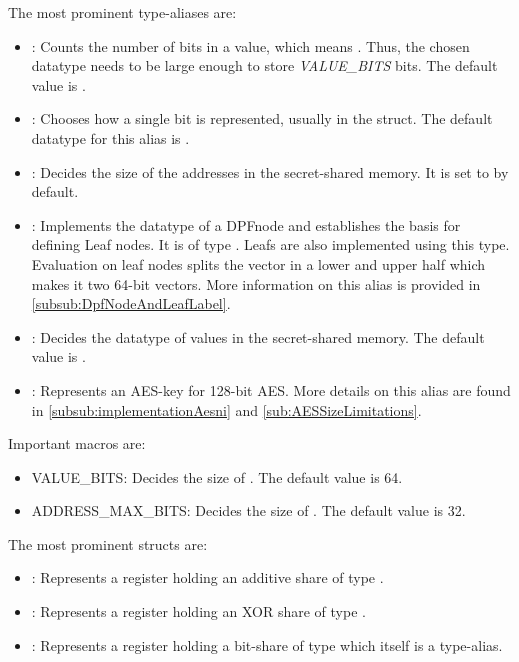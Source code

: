 The most prominent type-aliases are:
\begin{itemize}\label{itemize:importantAliases}
    \item {}: 
    Counts the number of bits in a value, which means .
    Thus, the chosen datatype needs to be large enough to store \textit{VALUE\_BITS} bits.
    The default value is .
    \item {}:
    Chooses how a single bit is represented, usually in the  struct.
    The default datatype for this alias is .
    \item {}: 
    Decides the size of the addresses in the secret-shared memory.
    It is set to  by default.
    \item {}: 
    Implements the datatype of a DPFnode and establishes the basis for defining Leaf nodes.
    It is of type .
    Leafs are also implemented using this type.
    Evaluation on leaf nodes splits the vector in a lower and upper half which makes it two 64-bit vectors.
    More information on this alias is provided in \ref{subsub:DpfNodeAndLeafLabel}.
    \item {}: 
    Decides the datatype of values in the secret-shared memory.
    The default value is .
    \item {}:
    Represents an AES-key for 128-bit AES.
    More details on this alias are found in \ref{subsub:implementationAesni} and \ref{sub:AESSizeLimitations}.
\end{itemize}
Important macros are:
\begin{itemize}\label{itemize:importantMacros}
    \item {VALUE\_BITS}: 
    Decides the size of . 
    The default value is 64.
    \item {ADDRESS\_MAX\_BITS}: 
    Decides the size of .
    The default value is 32.
\end{itemize}
The most prominent structs are:
\begin{itemize}\label{itemize:importantStructs}
    \item {}: 
    Represents a register holding an additive share of type .
    \item {}: 
    Represents a register holding an XOR share of type .
    \item {}: 
    Represents a register holding a bit-share of type  which itself is a  type-alias.
\end{itemize}

